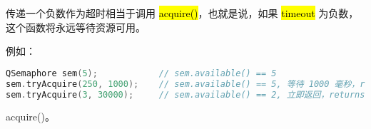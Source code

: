 \begin{notice}
传递一个负数作为超时相当于调用 \hl{acquire()}，也就是说，如果 \hl{timeout} 为负数，这个函数将永远等待资源可用。
\end{notice}

例如：

\begin{lstlisting}[language=C++]
QSemaphore sem(5);            // sem.available() == 5
sem.tryAcquire(250, 1000);    // sem.available() == 5, 等待 1000 毫秒，returns false
sem.tryAcquire(3, 30000);     // sem.available() == 2, 立即返回，returns true
\end{lstlisting}

\begin{seeAlso}
acquire()。
\end{seeAlso}

